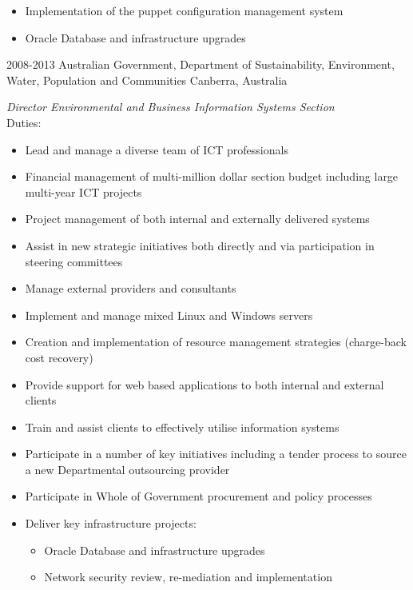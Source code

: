 \documentclass[]{friggeri-cv} %
\begin{document}
{\begin{entrylist}
{\begin{itemize}
\begin{itemize}
\item Implementation of the puppet configuration management system
\item Oracle Database and infrastructure upgrades
\end{itemize}
\end{itemize}}
\entry
{2008-2013}
{Australian Government, Department of Sustainability, Environment, Water, Population and Communities}
{Canberra, Australia}
{\emph{Director Environmental and Business Information Systems Section} \\
Duties:
\begin{itemize}
\item Lead and manage a diverse team of ICT professionals
\item Financial management of multi-million dollar section budget including large multi-year ICT projects
\item Project management of both internal and externally delivered systems
\item Assist in new strategic initiatives both directly and via participation in steering committees
\item Manage external providers and consultants
\item Implement and manage mixed Linux and Windows servers
\item Creation and implementation of resource management strategies (charge-back cost recovery)
\item Provide support for web based applications to both internal and external clients
\item Train and assist clients to effectively utilise information systems
\item Participate in a number of key initiatives including a tender process to source a new Departmental outsourcing provider
\item Participate in Whole of Government procurement and policy processes
\item Deliver key infrastructure projects:
\begin{itemize}
\item Oracle Database and infrastructure upgrades
\item Network security review, re-mediation and implementation
\end{itemize}
\end{itemize}}
\end{entrylist}}
\end{document}
